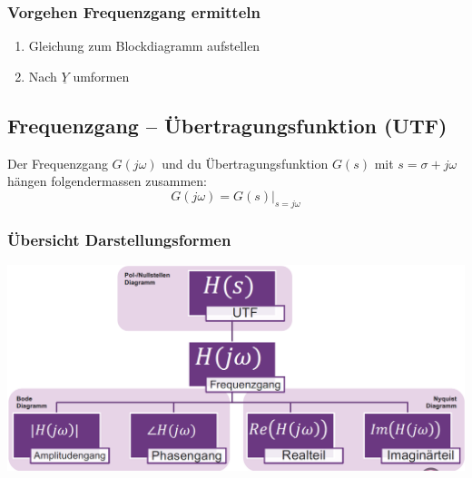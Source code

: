 \subsubsection{Vorgehen Frequenzgang ermitteln}
\begin{enumerate}
    \item Gleichung zum Blockdiagramm aufstellen
    \item Nach $\underline{Y}$ umformen 
\end{enumerate}

\subsection{Frequenzgang -- Übertragungsfunktion (UTF)}

Der Frequenzgang $G(j \omega)$ und du Übertragungsfunktion $G(s)$ mit $s = \sigma + j \omega$ hängen folgendermassen zusammen:
$$ \boxed{G(j \omega) = G(s) \big\vert_{s = j \omega}} $$

\subsubsection{Übersicht Darstellungsformen}

\begin{center}
    \includegraphics[width=0.75\columnwidth]{images/darstellungen_frequenzgang_utf.png}
\end{center}

